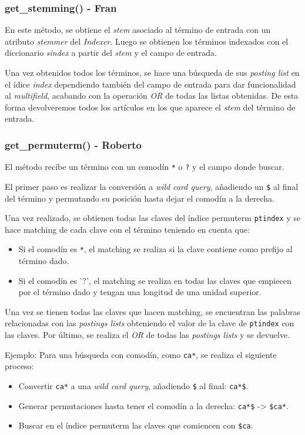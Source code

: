 \documentclass[12pt,a4paper]{article}
\begin{document}
\subsubsection{get\_stemming() - Fran}
En este método, se obtiene el \textit{stem} asociado al término de entrada con un atributo \textit{stemmer} del \textit{Indexer}. Luego se obtienen los términos indexados con el diccionario \textit{sindex} a partir del \textit{stem} y el campo de entrada.

Una vez obtenidos todos los términos, se hace una búsqueda de sus \textit{posting list} en el ídice \textit{index} dependiendo también del campo de entrada para dar funcionalidad al \textit{multifield}, acabando con la operación \textit{OR} de todas las listas obtenidas. De esta forma devolveremos todos los artículos en los que aparece el \textit{stem} del término de entrada.

\subsubsection{get\_permuterm() - Roberto}
El método recibe un término con un comodín \texttt{*} o \texttt{?} y el campo donde buscar.

El primer paso es realizar la conversión a \textit{wild card query}, añadiendo un \texttt{\$} al final del término y permutando su posición hasta dejar el comodín a la derecha.

Una vez realizado, se obtienen todas las claves del índice permuterm \texttt{ptindex} y se hace matching de cada clave con el término teniendo en cuenta que:
\begin{itemize}
  \item Si el comodín es \texttt{*}, el matching se realiza si la clave contiene como prefijo al término dado.
  \item Si el comodín es '?', el matching se realiza en todas las claves que empiecen por el término dado y tengan una longitud de una unidad superior.
\end{itemize}

Una vez se tienen todas las claves que hacen matching, se encuentran las palabras relacionadas con las \textit{postings lists} obteniendo el valor de la clave de \texttt{ptindex} con las claves. Por último, se realiza el \textit{OR} de todas las \textit{postings lists} y se devuelve.

Ejemplo: Para una búsqueda con comodín, como \texttt{ca*}, se realiza el siguiente proceso:
\begin{itemize}
  \item Convertir \texttt{ca*} a una \textit{wild card query}, añadiendo \texttt{\$} al final: \texttt{ca*\$}.
  \item Generar permutaciones hasta tener el comodín a la derecha: \texttt{ca*\$} -> \texttt{\$ca*}.
  \item Buscar en el índice permuterm las claves que comiencen con \texttt{\$ca}.
\end{itemize}
\end{document}
